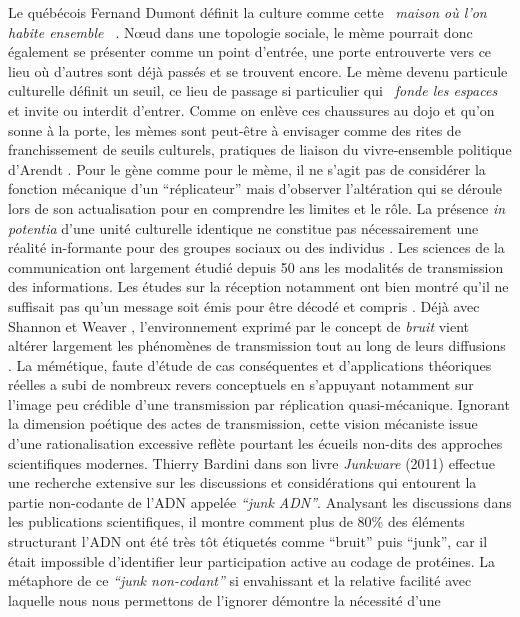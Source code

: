  Le québécois Fernand Dumont définit la culture comme cette \textit{{\guillemotleft}~maison o\`u l{\textquoteright}on habite ensemble~{\guillemotright} }\citep{Dumont1993}. N{\oe}ud dans une topologie sociale, le mème pourrait donc également se présenter comme un point d{\textquoteright}entrée, une porte entrouverte vers ce lieu o\`u d{\textquoteright}autres sont déjà passés et se trouvent encore. Le mème devenu particule culturelle définit un seuil, ce lieu de passage si particulier qui \textit{{\guillemotleft}~fonde les espaces~{\guillemotright}} \citep{Bonnin2000} et invite ou interdit d{\textquoteright}entrer. Comme on enlève ces chaussures au dojo et qu{\textquoteright}on sonne à la porte, les mèmes sont peut-être à envisager comme des rites de franchissement de seuils culturels, pratiques de liaison du vivre-ensemble politique d{\textquoteright}Arendt \citep{Arendt2001} . Pour le gène comme pour le mème, il ne s{\textquoteright}agit pas de considérer la fonction mécanique d{\textquoteright}un {\textquotedblleft}réplicateur{\textquotedblright} mais d{\textquoteright}observer l{\textquoteright}altération qui se déroule lors de son actualisation pour en comprendre les limites et le rôle. La présence \textit{in potentia }d{\textquoteright}une unité culturelle identique ne constitue pas nécessairement une réalité in-formante pour des groupes sociaux ou des individus \citep{Lissack2004}. Les sciences de la communication ont largement étudié depuis 50 ans les modalités de transmission des informations. Les études sur la réception notamment ont bien montré qu{\textquoteright}il ne suffisait pas qu{\textquoteright}un message soit émis pour être décodé et compris \citep{Liebes1990}. Déjà avec Shannon et Weaver \citep{Jakobson1960}, l{\textquoteright}environnement exprimé par le concept de\textit{ bruit }vient altérer largement les phénomènes de transmission tout au long de leurs diffusions \citep{Attali1978}. La mémétique, faute d{\textquoteright}étude de cas conséquentes et d{\textquoteright}applications théoriques réelles \citep{Jouxtel2014} a subi de nombreux revers conceptuels en s{\textquoteright}appuyant notamment sur l{\textquoteright}image peu crédible d{\textquoteright}une transmission par réplication quasi-mécanique. Ignorant la dimension poétique des actes de transmission, cette vision mécaniste issue d{\textquoteright}une rationalisation excessive reflète pourtant les écueils non-dits des approches scientifiques modernes. Thierry Bardini dans son livre \textit{Junkware }(2011) effectue une recherche extensive sur les discussions et considérations qui entourent la partie non-codante de l{\textquoteright}ADN appelée \textit{{\textquotedblleft}junk ADN{\textquotedblright}}. Analysant les discussions dans les publications scientifiques, il montre comment plus de 80\% des éléments structurant l{\textquoteright}ADN ont été très tôt étiquetés comme {\textquotedblleft}bruit{\textquotedblright} puis {\textquotedblleft}junk{\textquotedblright}, car il était impossible d{\textquoteright}identifier leur participation active au codage de protéines. La métaphore de ce \textit{{\textquotedblleft}junk non-codant{\textquotedblright} }si envahissant et la relative facilité avec laquelle nous nous permettons de l{\textquoteright}ignorer démontre la nécessité d{\textquoteright}une 